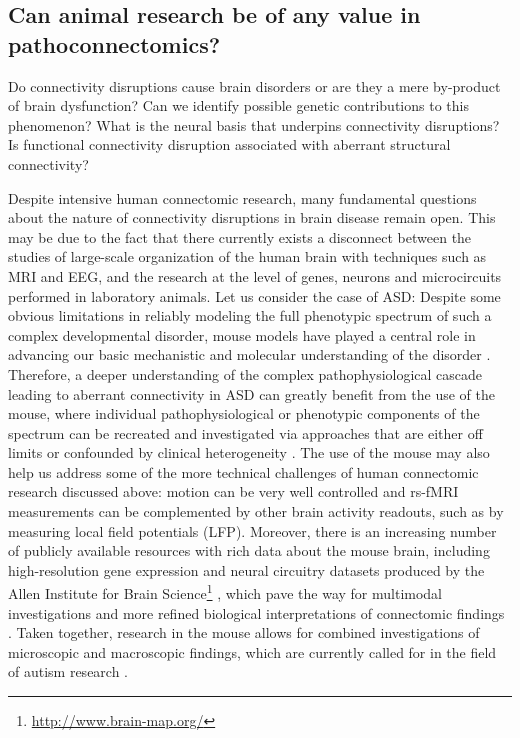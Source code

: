 \subsection{Can animal research be of any value in pathoconnectomics?}

Do connectivity disruptions cause brain disorders or are they a mere by-product
of brain dysfunction? Can we identify possible genetic contributions to this
phenomenon? What is the neural basis that underpins connectivity disruptions? Is
functional connectivity disruption associated with aberrant structural
connectivity?

Despite intensive human connectomic research, many fundamental questions about
the nature of connectivity disruptions in brain disease remain open. This may be
due to the fact that there currently exists a disconnect between the studies of
large-scale organization of the human brain with techniques such as MRI and EEG,
and the research at the level of genes, neurons and microcircuits performed in
laboratory animals. Let us consider the case of ASD: Despite some obvious
limitations in reliably modeling the full phenotypic spectrum of such a complex
developmental disorder, mouse models have played a central role in advancing our
basic mechanistic and molecular understanding of the disorder
\parencite{silverman2010a, delatorre-ubieta2016}. Therefore, a deeper
understanding of the complex pathophysiological cascade leading to aberrant
connectivity in ASD can greatly benefit from the use of the mouse, where
individual pathophysiological or phenotypic components of the spectrum can be
recreated and investigated via approaches that are either off limits or
confounded by clinical heterogeneity \parencite{nestler2010}. The use of the
mouse may also help us address some of the more technical challenges of human
connectomic research discussed above: motion can be very well controlled and
rs-fMRI measurements can be complemented by other brain activity readouts, such
as by measuring local field potentials (LFP).  Moreover, there is an increasing
number of publicly available resources with rich data about the mouse brain,
including high-resolution gene expression and neural circuitry datasets produced
by the Allen Institute for Brain
Science\footnote{\url{http://www.brain-map.org/}} \parencite{lein2007, oh2014},
which pave the way for multimodal investigations and more refined biological
interpretations of connectomic findings \parencite{konopka2017,
vandenheuvel2016}. Taken together, research in the mouse allows for combined
investigations of microscopic and macroscopic findings, which are currently
called for in the field of autism research \parencite{ecker2017}.

